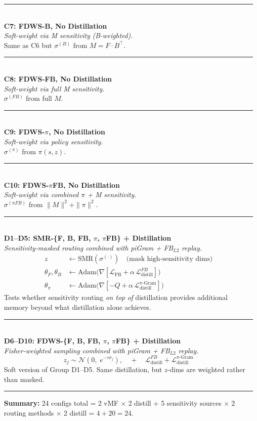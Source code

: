 \documentclass[10pt]{article}
\newcommand{\loss}{\mathcal{L}}
\newcommand{\method}[2]{%
  \noindent\rule{\textwidth}{0.5pt}\\[2pt]
  {\large\textbf{#1}}\\[2pt]
  \textit{#2}\\[3pt]
}
\begin{document}
\method{C7: FDWS-B, No Distillation}{Soft-weight via M sensitivity (B-weighted).}
Same as C6 but $\sigma^{(B)}$ from $M = F \cdot B^\top$.

\method{C8: FDWS-FB, No Distillation}{Soft-weight via full M sensitivity.}
$\sigma^{(FB)}$ from full $M$.

\method{C9: FDWS-$\pi$, No Distillation}{Soft-weight via policy sensitivity.}
$\sigma^{(\pi)}$ from $\pi(s,z)$.

\method{C10: FDWS-$\pi$FB, No Distillation}{Soft-weight via combined $\pi$ + M sensitivity.}
$\sigma^{(\pi FB)}$ from $\|M\|^2 + \|\pi\|^2$.

\method{D1--D5: SMR-\{F, B, FB, $\pi$, $\pi$FB\} + Distillation}{Sensitivity-masked routing combined with piGram + FB$_{L2}$ replay.}
\vspace{-0.5em}
\begin{align*}
z &\leftarrow \text{SMR}(\sigma^{(\cdot)}) \quad \text{(mask high-sensitivity dims)} \\
\theta_F, \theta_B &\leftarrow \mathrm{Adam}\bigl(\nabla[\loss_{\text{FB}} + \alpha\,\loss_{\text{distill}}^{FB}]\bigr) \\
\theta_\pi &\leftarrow \mathrm{Adam}\bigl(\nabla[-Q + \alpha\,\loss_{\text{distill}}^{\pi\text{-Gram}}]\bigr)
\end{align*}
Tests whether sensitivity routing \emph{on top of} distillation provides additional memory beyond what distillation alone achieves.

\method{D6--D10: FDWS-\{F, B, FB, $\pi$, $\pi$FB\} + Distillation}{Fisher-weighted sampling combined with piGram + FB$_{L2}$ replay.}
\vspace{-0.5em}
\[
z_j \sim \mathcal{N}(0,\; e^{-\tau\sigma_j}), \quad + \quad \loss_{\text{distill}}^{FB} + \loss_{\text{distill}}^{\pi\text{-Gram}}
\]
Soft version of Group D1--D5. Same distillation, but $z$-dims are weighted rather than masked.

\vspace{6pt}
\noindent\rule{\textwidth}{0.5pt}
\noindent\textbf{Summary:} 24 configs total = 2 vMF $\times$ 2 distill + 5 sensitivity sources $\times$ 2 routing methods $\times$ 2 distill = $4 + 20 = 24$.
\end{document}
